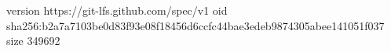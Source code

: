 version https://git-lfs.github.com/spec/v1
oid sha256:b2a7a7103be0d83f93e08f18456d6ccfc44bae3edeb9874305abee141051f037
size 349692
